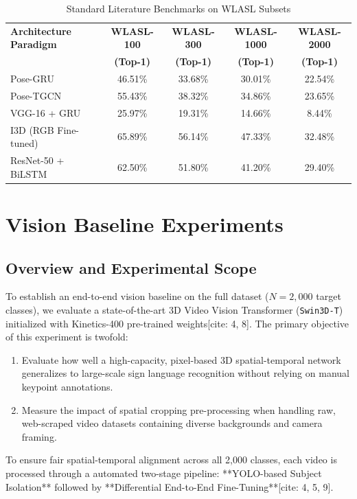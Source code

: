 \documentclass[12pt,a4paper]{article}
\begin{document}
\begin{table}[htbp]
\centering
\small
\caption{Standard Literature Benchmarks on WLASL Subsets}
\label{tab:related_works}
\begin{tabular}{lcccc}
\toprule
\textbf{Architecture Paradigm} & \textbf{WLASL-100} & \textbf{WLASL-300} & \textbf{WLASL-1000} & \textbf{WLASL-2000} \\
& \textbf{(Top-1)} & \textbf{(Top-1)} & \textbf{(Top-1)} & \textbf{(Top-1)} \\
\midrule
Pose-GRU & 46.51\% & 33.68\% & 30.01\% & 22.54\% \\
Pose-TGCN & 55.43\% & 38.32\% & 34.86\% & 23.65\% \\
VGG-16 + GRU & 25.97\% & 19.31\% & 14.66\% & 8.44\% \\
I3D (RGB Fine-tuned) & 65.89\% & 56.14\% & 47.33\% & 32.48\% \\
ResNet-50 + BiLSTM & 62.50\% & 51.80\% & 41.20\% & 29.40\% \\
\bottomrule
\end{tabular}
\end{table}


\section{Vision Baseline Experiments}

\subsection{Overview and Experimental Scope}
To establish an end-to-end vision baseline on the full dataset ($N = 2,000$ target classes), we evaluate a state-of-the-art 3D Video Vision Transformer (\texttt{Swin3D-T}) initialized with Kinetics-400 pre-trained weights[cite: 4, 8]. The primary objective of this experiment is twofold:
\begin{enumerate}
    \item Evaluate how well a high-capacity, pixel-based 3D spatial-temporal network generalizes to large-scale sign language recognition without relying on manual keypoint annotations.
    \item Measure the impact of spatial cropping pre-processing when handling raw, web-scraped video datasets containing diverse backgrounds and camera framing.
\end{enumerate}

To ensure fair spatial-temporal alignment across all 2,000 classes, each video is processed through a automated two-stage pipeline: **YOLO-based Subject Isolation** followed by **Differential End-to-End Fine-Tuning**[cite: 4, 5, 9].
\end{document}

